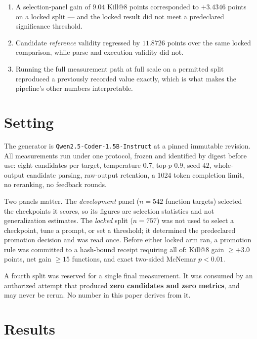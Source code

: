 \documentclass[10pt,conference]{IEEEtran}
\makeatletter
\newcommand{\killk}[1]{Kill@#1}
\makeatother
\begin{document}
\begin{enumerate}
  \item A selection-panel gain of $9.04$ \killk{8} points corresponded to
        $+3.4346$ points on a locked split --- and the locked result did not
        meet a predeclared significance threshold.
  \item Candidate \emph{reference} validity regressed by $11.8726$ points over
        the same locked comparison, while parse and execution validity did not.
  \item Running the full measurement path at full scale on a permitted split
        reproduced a previously recorded value exactly, which is what makes the
        pipeline's other numbers interpretable.
\end{enumerate}

\section{Setting}

The generator is \texttt{Qwen2.5-Coder-1.5B-Instruct} at a pinned immutable
revision. All measurements run under one protocol, frozen and identified by
digest before use: eight candidates per target, temperature $0.7$, top-$p$
$0.9$, seed $42$, whole-output candidate parsing, raw-output retention, a 1024
token completion limit, no reranking, no feedback rounds.

Two panels matter. The \emph{development} panel ($n = 542$ function targets)
selected the checkpoints it scores, so its figures are selection statistics and
not generalization estimates. The \emph{locked} split ($n = 757$) was not used
to select a checkpoint, tune a prompt, or set a threshold; it determined the
predeclared promotion decision and was read once. Before either locked arm ran, a promotion rule was
committed to a hash-bound receipt requiring all of: \killk{8} gain
$\geq +3.0$ points, net gain $\geq 15$ functions, and exact two-sided McNemar
$p < 0.01$.

A fourth split was reserved for a single final measurement. It was consumed by
an authorized attempt that produced \textbf{zero candidates and zero metrics},
and may never be rerun. No number in this paper derives from it.

\section{Results}
\end{document}
